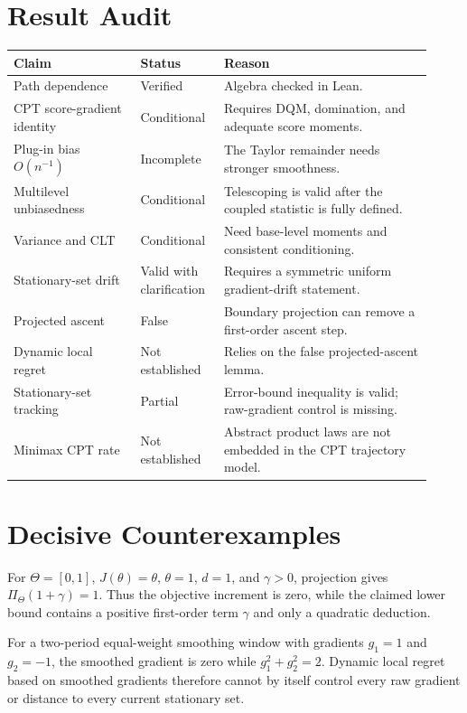 \documentclass[11pt]{article}
\begin{document}
\section*{Result Audit}
\begin{longtable}{p{0.28\linewidth}p{0.18\linewidth}p{0.46\linewidth}}
\toprule
Claim & Status & Reason \\
\midrule
Path dependence & \textcolor{ok}{Verified} & Algebra checked in Lean. \\
CPT score-gradient identity & \textcolor{warn}{Conditional} & Requires DQM, domination, and adequate score moments. \\
Plug-in bias $O(n^{-1})$ & \textcolor{warn}{Incomplete} & The Taylor remainder needs stronger smoothness. \\
Multilevel unbiasedness & \textcolor{warn}{Conditional} & Telescoping is valid after the coupled statistic is fully defined. \\
Variance and CLT & \textcolor{warn}{Conditional} & Need base-level moments and consistent conditioning. \\
Stationary-set drift & \textcolor{ok}{Valid with clarification} & Requires a symmetric uniform gradient-drift statement. \\
Projected ascent & \textcolor{fatal}{False} & Boundary projection can remove a first-order ascent step. \\
Dynamic local regret & \textcolor{fatal}{Not established} & Relies on the false projected-ascent lemma. \\
Stationary-set tracking & \textcolor{warn}{Partial} & Error-bound inequality is valid; raw-gradient control is missing. \\
Minimax CPT rate & \textcolor{fatal}{Not established} & Abstract product laws are not embedded in the CPT trajectory model. \\
\bottomrule
\end{longtable}

\section*{Decisive Counterexamples}
For $\Theta=[0,1]$, $J(\theta)=\theta$, $\theta=1$, $d=1$, and $\gamma>0$, projection gives $\Pi_\Theta(1+\gamma)=1$. Thus the objective increment is zero, while the claimed lower bound contains a positive first-order term $\gamma$ and only a quadratic deduction.

For a two-period equal-weight smoothing window with gradients $g_1=1$ and $g_2=-1$, the smoothed gradient is zero while $g_1^2+g_2^2=2$. Dynamic local regret based on smoothed gradients therefore cannot by itself control every raw gradient or distance to every current stationary set.
\end{document}
